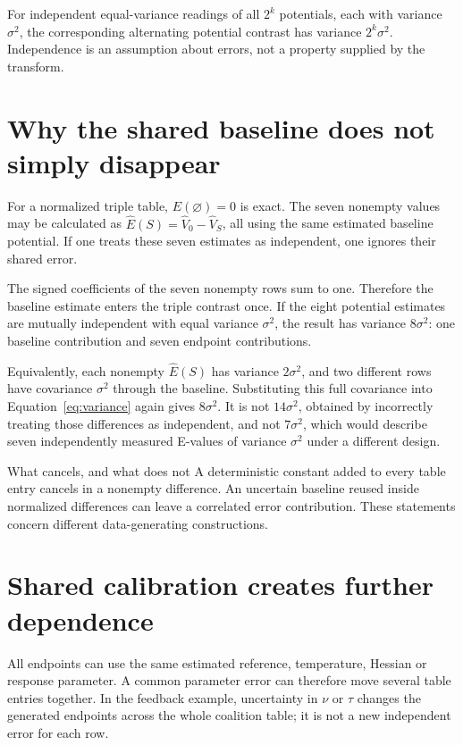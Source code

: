 For independent equal-variance readings of all $2^k$ potentials, each with variance $\sigma^2$, the corresponding alternating potential contrast has variance $2^k\sigma^2$. Independence is an assumption about errors, not a property supplied by the transform.

\section{Why the shared baseline does not simply disappear}
For a normalized triple table, $E(\varnothing)=0$ is exact. The seven nonempty values may be calculated as $\widehat E(S)=\widehat V_0-\widehat V_S$, all using the same estimated baseline potential. If one treats these seven estimates as independent, one ignores their shared error.

The signed coefficients of the seven nonempty rows sum to one. Therefore the baseline estimate enters the triple contrast once. If the eight potential estimates are mutually independent with equal variance $\sigma^2$, the result has variance $8\sigma^2$: one baseline contribution and seven endpoint contributions.

Equivalently, each nonempty $\widehat E(S)$ has variance $2\sigma^2$, and two different rows have covariance $\sigma^2$ through the baseline. Substituting this full covariance into Equation~\ref{eq:variance} again gives $8\sigma^2$. It is not $14\sigma^2$, obtained by incorrectly treating those differences as independent, and not $7\sigma^2$, which would describe seven independently measured E-values of variance $\sigma^2$ under a different design.

\begin{cautionbox}{What cancels, and what does not}
A deterministic constant added to every table entry cancels in a nonempty difference. An uncertain baseline reused inside normalized differences can leave a correlated error contribution. These statements concern different data-generating constructions.
\end{cautionbox}

\section{Shared calibration creates further dependence}
All endpoints can use the same estimated reference, temperature, Hessian or response parameter. A common parameter error can therefore move several table entries together. In the feedback example, uncertainty in $\nu$ or $\tau$ changes the generated endpoints across the whole coalition table; it is not a new independent error for each row.

